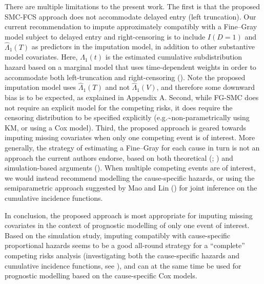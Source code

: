 \documentclass[
  letterpaper,
  paper=240mm:170mm,
  twoside=true,
  open=right,
  fontsize=10pt,
  pagesize=false,
  BCOR=15mm,
  DIV=14,
  headinclude=true,
  footinclude=false,
  headsepline=on]{scrbook}
\begin{document}
There are multiple limitations to the present work. The first is that
the proposed SMC-FCS approach does not accommodate delayed entry (left
truncation). Our current recommendation to impute approximately
compatibly with a Fine--Gray model subject to delayed entry and
right-censoring is to include \(I(D=1)\) and \(\hat{\Lambda}_1(T)\) as
predictors in the imputation model, in addition to other substantive
model covariates. Here, \(\hat{\Lambda}_1(t)\) is the estimated
cumulative subdistribution hazard based on a marginal model that uses
time-dependent weights in order to accommodate both left-truncation and
right-censoring
(). Note the proposed imputation model uses \(\hat{\Lambda}_1(T)\)
and not \(\hat{\Lambda}_1(V)\), and therefore some downward bias is to
be expected, as explained in Appendix A. Second, while FG-SMC does not
require an explicit model for the competing risks, it does require the
censoring distribution to be specified explicitly
(e.g.\textasciitilde non-parametrically using KM, or using a Cox model).
Third, the proposed approach is geared towards imputing missing
covariates when only one competing event is of interest. More generally,
the strategy of estimating a Fine--Gray for each cause in turn is not an
approach the current authors endorse, based on both theoretical
(;
) and simulation-based arguments
(). When multiple competing events are of interest, we would instead
recommend modelling the cause-specific hazards, or using the
semiparametric approach suggested by Mao and Lin
() for
joint inference on the cumulative incidence functions.

In conclusion, the proposed approach is most appropriate for imputing
missing covariates in the context of prognostic modelling of only one
event of interest. Based on the simulation study, imputing compatibly
with cause-specific proportional hazards seems to be a good all-round
strategy for a ``complete'' competing risks analysis (investigating both
the cause-specific hazards and cumulative incidence functions, see
), and can at the same time be used for prognostic modelling
based on the cause-specific Cox models.
\end{document}
